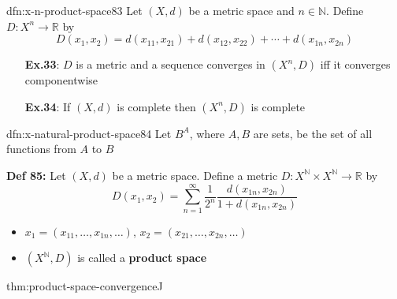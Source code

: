 \documentclass[landscape, 8pt]{extarticle}
\begin{document}
\begin{multicols}{3}
\vspace{-5pt}
\begin{dfn}{dfn:x-n-product-space}{83}
    \vspace{-5pt}
    Let $(X, d)$ be a metric space and $n\in \mathbb{N}$. Define $D : X^{n} \to \mathbb{R}$ by
    \[D(x_{1}, x_{2}) = d(x_{11}, x_{21}) + d(x_{12}, x_{22}) + \cdots + d(x_{1n}, x_{2n})\]

    \vspace{-5pt}

    \vspace{-8pt}
    \begin{itemize}
        \item[\textbf{Ex.33}:] $D$ is a metric and a sequence converges in $(X^{n}, D)$ iff it \newline converges componentwise
        \item[\textbf{Ex.34}:] If $(X, d)$ is complete then $(X^{n}, D)$ is complete
    \end{itemize}
\end{dfn}

\vspace{-5pt}
\begin{dfn}{dfn:x-natural-product-space}{84}
    \vspace{-5pt}
    Let $B^{A}$, where $A, B$ are sets, be the set of all functions from $A$ to $B$

    \longrule{0.08ex}
    \textbf{Def 85:} Let $(X, d)$ be a metric space. Define a metric $D : X^{\mathbb{N}} \times X^{\mathbb{N}} \to \mathbb{R}$ by
    \[D(x_{1}, x_{2}) = \sum_{n = 1}^{\infty} \frac{1}{2^{n}} \frac{d(x_{1n}, x_{2n})}{1 + d(x_{1n}, x_{2n})}\]

    \vspace{-8pt}
    \begin{itemize}[leftmargin=*]
        \item $x_{1} = (x_{11},\dots, x_{1n},\dots)$, $x_{2} = (x_{21},\dots,x_{2n},\dots)$
        \item $(X^{\mathbb{N}}, D)$ is called a \textbf{product space}
    \end{itemize}
\end{dfn}

\vspace{-5pt}
\begin{thm}{thm:product-space-convergence}{J}
    \vspace{-5pt}


\end{thm}
\end{multicols}
\end{document}
